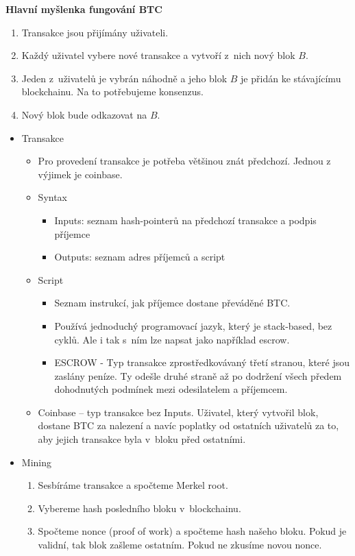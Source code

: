 \documentclass[a4paper,12pt,titlepage]{article}
\def\podnadpis#1{{\bigskip\bf\noindent#1\medskip\par}}
\begin{document}
\podnadpis{Hlavní myšlenka fungování BTC}
\begin{enumerate}
	\item{Transakce jsou přijímány uživateli.}
	\item{Každý uživatel vybere nové transakce a vytvoří z~nich nový blok \(B\).}
	\item{Jeden z~uživatelů je vybrán náhodně a jeho blok \(B\) je přidán ke stávajícímu blockchainu.
			Na to potřebujeme konsenzus.}
	\item{Nový blok bude odkazovat na \(B\).}
\end{enumerate}

\begin{itemize}
	\item{Transakce}
		\begin{itemize}
			\item{Pro provedení transakce je potřeba většinou znát předchozí. 
				Jednou z výjimek je coinbase.}
			\item{Syntax}
				\begin{itemize}
					\item{Inputs:
						seznam hash-pointerů na předchozí transakce a podpis příjemce}
					\item{Outputs:
						seznam adres příjemců a script}
				\end{itemize}
			\item{Script} 
				\begin{itemize}
					\item{Seznam instrukcí, jak příjemce dostane převáděné BTC.}
					\item{Používá jednoduchý programovací jazyk, který je stack-based, bez cyklů. 
						Ale i tak s~ním lze napsat  jako například escrow.}
					\item{ESCROW - Typ transakce zprostředkovávaný třetí stranou, které jsou zaslány peníze.
						Ty odešle druhé straně až po dodržení 
						všech předem dohodnutých podmínek mezi odesilatelem a příjemcem.}
				\end{itemize}
			\item{Coinbase -- typ transakce bez Inputs. 
			 	Uživatel, který vytvořil blok, dostane BTC za nalezení
				a navíc poplatky od ostatních uživatelů za to, 
				aby jejich transakce byla v~bloku před ostatními.}
		\end{itemize}
	\item{Mining}
		\begin{enumerate}
			\item{Sesbíráme transakce a spočteme Merkel root.}
			\item{Vybereme hash posledního bloku v~blockchainu.}
			\item{Spočteme nonce (proof of work) a spočteme hash našeho bloku.
				Pokud je validní, tak blok zašleme ostatním. Pokud ne zkusíme novou nonce.}
		\end{enumerate}
		

\end{itemize}
\end{document}
